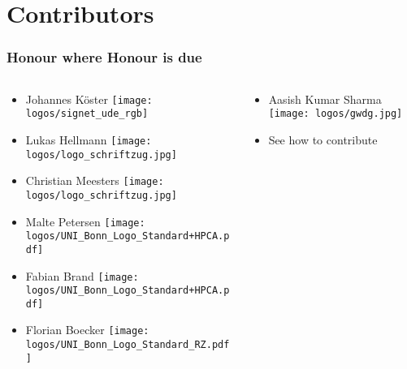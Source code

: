 \section{Contributors}

\begin{frame}
  \frametitle{Honour where Honour is due}
  \begin{columns}
  	\begin{column}{.5\textwidth}
  	   \begin{itemize}
  	   	\item Johannes Köster \texttt{[image: logos/signet\_ude\_rgb]}
  	   	\item Lukas Hellmann \texttt{[image: logos/logo\_schriftzug.jpg]}
  	   	\item Christian Meesters \texttt{[image: logos/logo\_schriftzug.jpg]}
  	   	\item Malte Petersen \texttt{[image: logos/UNI\_Bonn\_Logo\_Standard+HPCA.pdf]}
  	   	\item Fabian Brand \texttt{[image: logos/UNI\_Bonn\_Logo\_Standard+HPCA.pdf]}
  	   	\item Florian Boecker \texttt{[image: logos/UNI\_Bonn\_Logo\_Standard\_RZ.pdf]}
  	   \end{itemize}	
  	\end{column}
    \begin{column}{.5\textwidth}
      \begin{itemize}
    	\item Aasish Kumar Sharma \texttt{[image: logos/gwdg.jpg]}
    	\item See how to contribute 
      \end{itemize}
    \end{column}
  \end{columns}
		
\end{frame}

